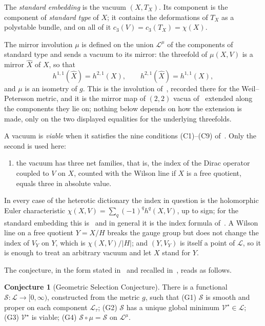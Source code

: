 \documentclass[11pt]{amsart}
\theoremstyle{definition}
\newtheorem{conjecture}[theorem]{Conjecture}
\theoremstyle{remark}
\newcommand{\cL}{\mathcal{L}}
\newcommand{\cS}{\mathcal{S}}
\newcommand{\cV}{\mathcal{V}}
\begin{document}
The \emph{standard embedding} is the vacuum $(X,T_X)$. Its component is the
component of \emph{standard type} of $X$; it contains the deformations of
$T_X$ as a polystable bundle, and on all of it $c_3(V)=c_3(T_X)=\chi(X)$.

The mirror involution $\mu$ is defined on the union $\cL^\mu$ of the
components of standard type and sends a vacuum to its mirror: the threefold of
$\mu(X,V)$ is a mirror $\widehat X$ of $X$, so that
\[
h^{1,1}(\widehat X)=h^{2,1}(X),\qquad h^{2,1}(\widehat X)=h^{1,1}(X),
\]
and $\mu$ is an isometry of $g$. This is the involution of~\cite{Bha26a},
recorded there for the Weil--Petersson metric, and it is the mirror map of
$(2,2)$ vacua of~\cite{GP90,CDGP91} extended along the components they lie
on; nothing below depends on how the extension is made, only on the two
displayed equalities for the underlying threefolds.

A vacuum is \emph{viable} when it satisfies the nine conditions (C1)--(C9)
of~\cite{Bha26a}. Only the second is used here:
\begin{enumerate}[label=\textup{(C2)},leftmargin=*]
\item the vacuum has three net families, that is, the index of the Dirac
operator coupled to $V$ on $X$, counted with the Wilson line if $X$ is a free
quotient, equals three in absolute value.
\end{enumerate}
In every case of the heterotic dictionary the index in question is the
holomorphic Euler characteristic $\chi(X,V)=\sum_q(-1)^q h^q(X,V)$, up to
sign; for the standard embedding this is~\cite[Theorem~6]{BB26} and in general
it is the index formula of~\cite[Chapter~14]{GSW87}. A Wilson line on a free
quotient $Y=X/H$ breaks the gauge group but does not change the index of $V_Y$
on $Y$, which is $\chi(X,V)/|H|$; and $(Y,V_Y)$ is itself a point of $\cL$,
so it is enough to treat an arbitrary vacuum and let $X$ stand for $Y$.

The conjecture, in the form stated in~\cite{Bha26a} and recalled
in~\cite{BB26}, reads as follows.

\begin{conjecture}[Geometric Selection Conjecture]\label{conj:gsc}
There is a functional $\cS:\cL\to[0,\infty)$, constructed from the metric
$g$, such that \textup{(G1)} $\cS$ is smooth and proper on each component
$\cL_\tau$; \textup{(G2)} $\cS$ has a unique global minimum
$\cV^\star\in\cL$; \textup{(G3)} $\cV^\star$ is viable; \textup{(G4)}
$\cS\circ\mu=\cS$ on $\cL^\mu$.
\end{conjecture}
\end{document}
